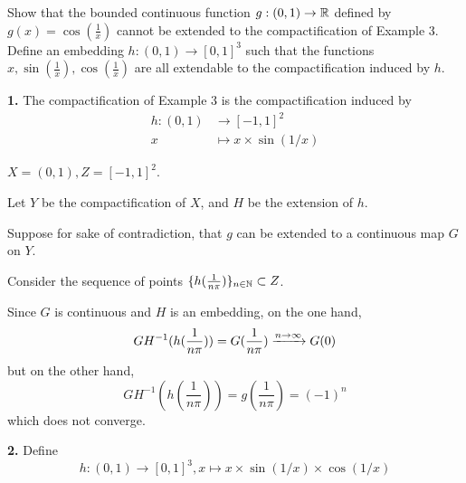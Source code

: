 \documentclass[a4paper, 10pt]{article}
\begin{document}
\begin{problem} [38.2]
    Show that the bounded continuous function $g: (0, 1) \to \mathbb{R}$ defined by $g(x) = \cos(\frac{1}{x})$ cannot be extended to the compactification of Example 3. Define an embedding $h: (0, 1) \to [0, 1]^3$ such that the functions $x, \sin(\frac{1}{x}), \cos(\frac{1}{x})$ are all extendable to the compactification induced by $h$.
\end{problem}
\begin{solution}
    \textbf{1.} The compactification of Example 3 is the compactification induced by \begin{align*}
    h: (0, 1) &\to [-1, 1]^2 \\
    x &\mapsto x \times \sin(1/x)
    \end{align*}

    $X = (0, 1), Z = [-1, 1]^2$.

    Let $Y$ be the compactification of $X$, and $H$ be the extension of $h$.

    Suppose for sake of contradiction, that $g$ can be extended to a continuous map $G$ on $Y$.
    
    Consider the sequence of points $\{h(\frac{1}{n\pi})\}_{n \in \mathbb{N}} \subset Z$.

    Since $G$ is continuous and $H$ is an embedding, on the one hand,
     \begin{equation*}
    GH^{-1}(h(\frac{1}{n \pi})) = G(\frac{1}{n\pi}) \xrightarrow{n \to \infty} G(0)
    \end{equation*}
    but on the other hand,
    \begin{equation}
    GH^{-1}(h(\frac{1}{n \pi})) = g(\frac{1}{n\pi}) = (-1)^n
    \end{equation}
    which does not converge.

    \textbf{2.} Define \begin{equation*}
    h: (0, 1) \to [0, 1]^3, x \mapsto x \times \sin(1/x) \times \cos(1/x)
    \end{equation*} 
\end{solution}  
\end{document}
